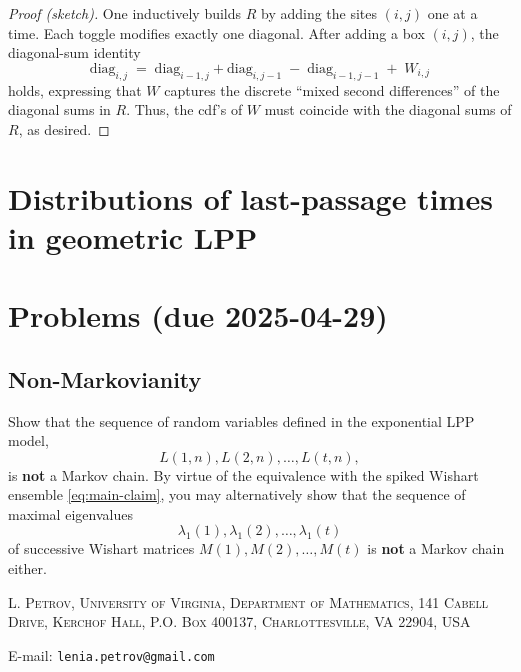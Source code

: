 \documentclass[letterpaper,11pt,oneside,reqno]{article}
\numberwithin{equation}{section}
\theoremstyle{definition}
\begin{document}
\begin{proof}[Proof (sketch)]
	One inductively builds $R$ by adding the sites $(i,j)$ one at a time.  Each toggle modifies exactly one diagonal.
	After adding a box $(i,j)$, the diagonal-sum identity
\[
\mathrm{diag}_{i,j}
\;=\;
\mathrm{diag}_{i-1,j} + \mathrm{diag}_{i,j-1}
\;-\;
\mathrm{diag}_{i-1,j-1}
\;+\;
W_{i,j}
\]
holds, expressing that $W$ captures the discrete ``mixed second differences'' of the diagonal sums in $R$.
Thus, the cdf's of $W$ must coincide with the diagonal sums of $R$, as desired.
\end{proof}

\section{Distributions of last-passage times in geometric LPP}
\label{sec:distributions_geometric_LPP}

\subsection{}




































\appendix
\setcounter{section}{13}

\section{Problems (due 2025-04-29)}

\subsection{Non-Markovianity}

Show that the sequence of random variables defined in the exponential LPP model,
\[
L(1,n),L(2,n),\dots,L(t,n),
\]
is \textbf{not} a Markov chain.
By virtue of the equivalence with the spiked Wishart ensemble \eqref{eq:main-claim},
you may alternatively show that the sequence
of maximal eigenvalues
\[
\lambda_1(1),\lambda_1(2),\dots,\lambda_1(t)
\]
of successive
Wishart matrices $M(1),M(2),\dots,M(t)$ is \textbf{not} a Markov chain either.








\medskip

\textsc{L. Petrov, University of Virginia, Department of Mathematics, 141 Cabell Drive, Kerchof Hall, P.O. Box 400137, Charlottesville, VA 22904, USA}

E-mail: \texttt{lenia.petrov@gmail.com}
\end{document}
